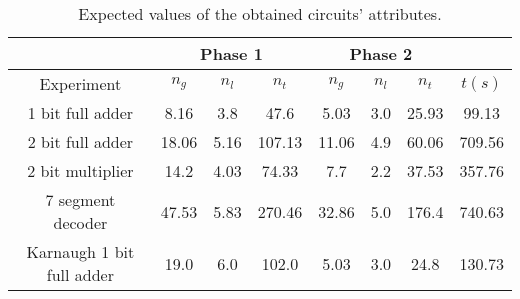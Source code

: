 \documentclass[12pt]{article}
\begin{document}
\begin{table}[H]
	\centering
	\caption{Expected values of the obtained circuits' attributes.}
	\begin{tabular}{|c|c|c|c|c|c|c|c|}
		\cline{2-7}
		\multicolumn{1}{c}{} & \multicolumn{3}{|c|}{Phase 1} & \multicolumn{3}{c|}{Phase 2} & \multicolumn{1}{c}{} \\
		\hline
		Experiment & $n_g$ & $n_l$ & $n_t$ & $n_g$ & $n_l$ & $n_t$ & $t(s)$ \\
		\hline
		1 bit full adder & 8.16 & 3.8 & 47.6 & 5.03 & 3.0 & 25.93 & 99.13 \\
		2 bit full adder & 18.06 & 5.16 & 107.13 & 11.06 & 4.9 & 60.06 & 709.56 \\
		2 bit multiplier & 14.2 & 4.03 & 74.33 & 7.7 & 2.2 & 37.53 & 357.76 \\
		7 segment decoder & 47.53 & 5.83 & 270.46 & 32.86 & 5.0 & 176.4 & 740.63 \\
		Karnaugh 1 bit full adder & 19.0 & 6.0 & 102.0 & 5.03 & 3.0 & 24.8 & 130.73 \\
		\hline
	\end{tabular}
	\label{tab:resultados}
\end{table}
\end{document}
